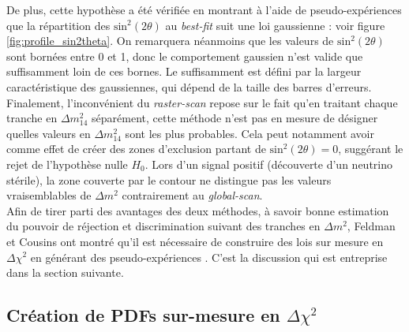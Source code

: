 \bigbreak

De plus, cette hypothèse a été vérifiée en montrant à l'aide de pseudo-expériences que la répartition des $\textrm{sin}^2(2\theta)$ au \textit{best-fit} suit une loi gaussienne : voir figure \ref{fig:profile_sin2theta}. On remarquera néanmoins que les valeurs de $\textrm{sin}^2(2\theta)$ sont bornées entre 0 et 1, donc le comportement gaussien n'est valide que suffisamment loin de ces bornes. Le \og suffisamment \fg{} est défini par la largeur caractéristique des gaussiennes, qui dépend de la taille des barres d'erreurs. Finalement, l'inconvénient du \textit{raster-scan} repose sur le fait qu'en traitant chaque tranche en $\Delta m^2_{14}$ séparément, cette méthode n'est pas en mesure de désigner quelles valeurs en $\Delta m^2_{14}$ sont les plus probables. Cela peut notamment avoir comme effet de créer des zones d'exclusion partant de $\textrm{sin}^2(2\theta) = 0$, suggérant le rejet de l'hypothèse nulle $H_0$. Lors d'un signal positif (découverte d'un neutrino stérile), la zone couverte par le contour ne distingue pas les valeurs vraisemblables de $\Delta m^2$ contrairement au \textit{global-scan}.\\

Afin de tirer parti des avantages des deux méthodes, à savoir bonne estimation du pouvoir de réjection et discrimination suivant des tranches en $\Delta m^2$, Feldman et Cousins \cite{Feldman:1998wt} ont montré qu'il est nécessaire de construire des lois sur mesure en $\Delta\chi^2$ en générant des \og pseudo-expériences \fg{}. C'est la discussion qui est entreprise dans la section suivante.

\bigbreak

\subsection{Création de PDFs sur-mesure en $\Delta \chi^2$}
\label{sec:custom_PDF_generation}

